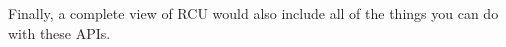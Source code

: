 Finally, a complete view of RCU would also include
all of the things you can do with these APIs.


%
